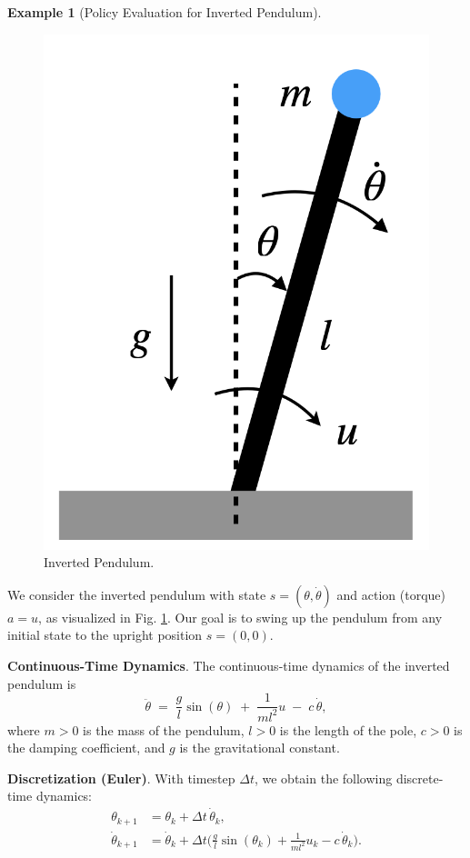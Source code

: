 \documentclass[
]{book}
\theoremstyle{definition}
\theoremstyle{definition}
\newtheorem{example}{Example}[chapter]
\theoremstyle{definition}
\theoremstyle{definition}
\theoremstyle{remark}
\begin{document}
\begin{example}[Policy Evaluation for Inverted Pendulum]
\protect\hypertarget{exm:InfiniteHorizonMDPPolicyEvaluation}{}\label{exm:InfiniteHorizonMDPPolicyEvaluation}\leavevmode

\begin{figure}

{\centering \includegraphics[width=0.4\linewidth]{images/MDP/pendulum-drawing} 

}

\caption{Inverted Pendulum.}\label{fig:mdp-pendulum-illustration}
\end{figure}

We consider the inverted pendulum with state \(s=(\theta, \dot\theta)\) and action (torque) \(a = u\), as visualized in Fig. \ref{fig:mdp-pendulum-illustration}. Our goal is to swing up the pendulum from any initial state to the upright position \(s = (0,0)\).

\textbf{Continuous-Time Dynamics}. The continuous-time dynamics of the inverted pendulum is
\[
\ddot{\theta} \;=\; \frac{g}{l}\sin(\theta) \;+\; \frac{1}{ml^2}u \;-\; c\,\dot{\theta},
\]
where \(m > 0\) is the mass of the pendulum, \(l > 0\) is the length of the pole, \(c > 0\) is the damping coefficient, and \(g\) is the gravitational constant.

\textbf{Discretization (Euler)}. With timestep \(\Delta t\), we obtain the following discrete-time dynamics:
\begin{equation}
\begin{split}
\theta_{k+1} &= \theta_k + \Delta t \, \dot{\theta}_k, \\
\dot{\theta}_{k+1} &= \dot{\theta}_k + \Delta t
\Big(\tfrac{g}{l}\sin(\theta_k) + \tfrac{1}{ml^2}u_k - c\,\dot{\theta}_k\Big).
\end{split}
\label{eq:PendulumDynamicsDiscrete}
\end{equation}


\end{example}
\end{document}
